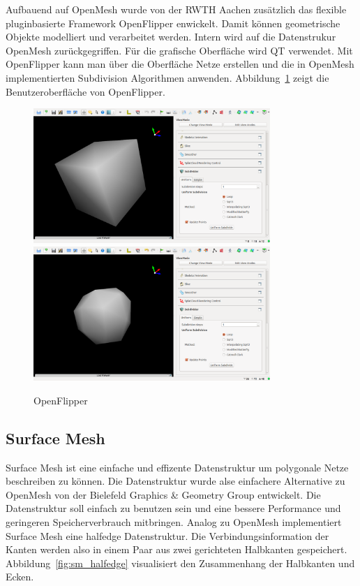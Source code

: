 Aufbauend auf OpenMesh wurde von der \acs{RWTH} Aachen zusätzlich das flexible pluginbasierte Framework OpenFlipper enwickelt.
Damit können geometrische Objekte modelliert und verarbeitet werden. Intern wird auf die Datenstrukur OpenMesh zurückgegriffen.
Für die grafische Oberfläche wird QT verwendet.
Mit OpenFlipper kann man über die Oberfläche Netze erstellen und die in OpenMesh implementierten Subdivision Algorithmen anwenden.
Abbildung~\ref{fig:openflipper} zeigt die Benutzeroberfläche von OpenFlipper.
\begin{figure}[h]
  \caption{OpenFlipper}
  \centering
  \includegraphics[width=0.8\textwidth]{content/media/openflipper_cube}
  \includegraphics[width=0.8\textwidth]{content/media/openflipper_loop}
  \label{fig:openflipper}
\end{figure}


\subsection{Surface Mesh}

Surface Mesh ist eine einfache und effizente Datenstruktur um polygonale Netze beschreiben zu können.
Die Datenstruktur wurde alse einfachere Alternative zu OpenMesh von der Bielefeld Graphics \& Geometry Group entwickelt.
Die Datenstruktur soll einfach zu benutzen sein und eine bessere Performance und geringeren Speicherverbrauch mitbringen.
Analog zu OpenMesh implementiert Surface Mesh eine halfedge Datenstruktur.
Die Verbindungsinformation der Kanten werden also in einem Paar aus zwei gerichteten Halbkanten gespeichert.
Abbildung~\ref{fig:sm_halfedge} visualisiert den Zusammenhang der Halbkanten und Ecken.

